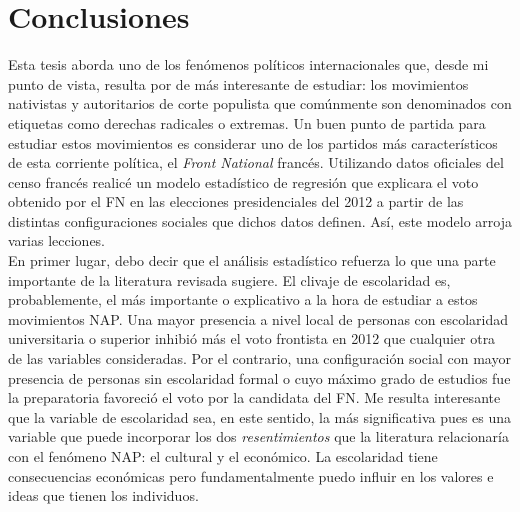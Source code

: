 \chapter{Conclusiones}

Esta tesis aborda uno de los fenómenos políticos internacionales que, desde mi punto de vista, resulta por de más interesante de estudiar: los movimientos nativistas y autoritarios de corte populista que comúnmente son denominados con etiquetas como derechas radicales o extremas. Un buen punto de partida para estudiar estos movimientos es considerar uno de los partidos más característicos de esta corriente política, el \textit{Front National} francés. Utilizando datos oficiales del censo francés realicé un modelo estadístico de regresión que explicara el voto obtenido por el FN en las elecciones presidenciales del 2012 a partir de las distintas configuraciones sociales que dichos datos definen. Así, este modelo arroja varias lecciones.\\

En primer lugar, debo decir que el análisis estadístico refuerza lo que una parte importante de la literatura revisada sugiere. El clivaje de escolaridad es, probablemente, el más importante o explicativo a la hora de estudiar a estos movimientos NAP. Una mayor presencia a nivel local de personas con escolaridad universitaria o superior inhibió más el voto frontista en 2012 que cualquier otra de las variables consideradas. Por el contrario, una configuración social con mayor presencia de personas sin escolaridad formal o cuyo máximo grado de estudios fue la preparatoria favoreció el voto por la candidata del FN. Me resulta interesante que la variable de escolaridad sea, en este sentido, la más significativa pues es una variable que puede incorporar los dos \textit{resentimientos} que la literatura relacionaría con el fenómeno NAP: el cultural y el económico. La escolaridad tiene consecuencias económicas pero fundamentalmente puedo influir en los valores e ideas que tienen los individuos.\\

